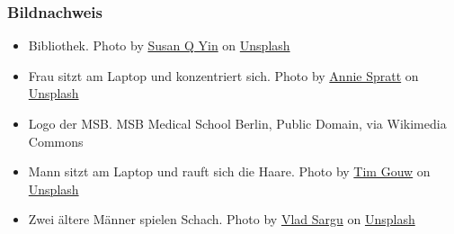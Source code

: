 \documentclass{beamer}
\begin{document}
\begin{frame}
\frametitle{Bildnachweis}


\begin{tiny}
 
\begin{itemize}

\item 
Bibliothek. Photo by \href{https://unsplash.com/@syinq?utm_content=creditCopyText&utm_medium=referral&utm_source=unsplash}{Susan Q Yin} on \href{https://unsplash.com/photos/books-on-brown-wooden-shelf-2JIvboGLeho?utm_content=creditCopyText&utm_medium=referral&utm_source=unsplash}{Unsplash}
  

\item 
Frau sitzt am Laptop und konzentriert sich. Photo by \href{https://unsplash.com/@anniespratt?utm_content=creditCopyText&utm_medium=referral&utm_source=unsplash}{Annie Spratt} on \href{https://unsplash.com/photos/woman-in-black-long-sleeve-shirt-using-macbook-air-on-brown-wooden-table-CV3nkG7XIwg?utm_content=creditCopyText&utm_medium=referral&utm_source=unsplash}{Unsplash}
  

  
\item
Logo der MSB. MSB Medical School Berlin, Public Domain, via Wikimedia Commons

\item 
Mann sitzt am Laptop und rauft sich die Haare. Photo by \href{https://unsplash.com/@punttim?utm_content=creditCopyText&utm_medium=referral&utm_source=unsplash}{Tim Gouw} on \href{https://unsplash.com/photos/man-wearing-white-top-using-macbook-1K9T5YiZ2WU?utm_content=creditCopyText&utm_medium=referral&utm_source=unsplash}{Unsplash}


\item 
Zwei ältere Männer spielen Schach. Photo by \href{https://unsplash.com/@vladsargu?utm_content=creditCopyText&utm_medium=referral&utm_source=unsplash}{Vlad Sargu} on \href{https://unsplash.com/photos/two-men-playing-chess-ItphH2lGzuI?utm_content=creditCopyText&utm_medium=referral&utm_source=unsplash}{Unsplash}
  

\end{itemize}

\end{tiny}
\end{frame}
\end{document}

